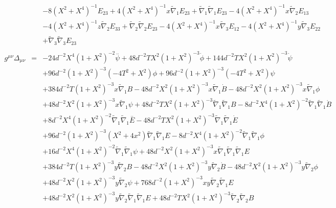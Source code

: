 \documentclass[10pt,letterpaper]{article}
\numberwithin{equation}{section}
\begin{document}
\begin{appendices}
\begin{eqnarray}
&& - 8 (X^2 + X^4)^{-1} E_{23} + 4 (X^2 + X^4)^{-1} x \tilde{\nabla}_{1}E_{23} + \tilde{\nabla}_{1}\tilde{\nabla}_{1}E_{23} - 4 (X^2 + X^4)^{-1} x \tilde{\nabla}_{2}E_{13} \nonumber \\ 
&& - 4 (X^2 + X^4)^{-1} z \tilde{\nabla}_{2}E_{33} + \tilde{\nabla}_{2}\tilde{\nabla}_{2}E_{23} - 4 (X^2 + X^4)^{-1} x \tilde{\nabla}_{3}E_{12} - 4 (X^2 + X^4)^{-1} y \tilde{\nabla}_{3}E_{22} \nonumber \\ 
&& + \tilde{\nabla}_{3}\tilde{\nabla}_{3}E_{23}
\\  \nonumber\\ 
g^{\mu\nu}\Delta_{\mu\nu}&=& -24 d^{-2} X^4 (1 + X^2)^{-2} \overset{..}{\psi} + 48 d^{-2} T X^2 (1 + X^2)^{-3} \dot{\phi} + 144 d^{-2} T X^2 (1 + X^2)^{-3} \dot{\psi} \nonumber \\ 
&& + 96 d^{-2} (1 + X^2)^{-3} (-4 T^2 + X^2) \phi + 96 d^{-2} (1 + X^2)^{-3} (-4 T^2 + X^2) \psi \nonumber \\ 
&& + 384 d^{-2} T (1 + X^2)^{-3} x \tilde{\nabla}_{1}B - 48 d^{-2} X^2 (1 + X^2)^{-3} x \tilde{\nabla}_{1}\dot{B} - 48 d^{-2} X^2 (1 + X^2)^{-3} x \tilde{\nabla}_{1}\phi \nonumber \\ 
&& + 48 d^{-2} X^2 (1 + X^2)^{-3} x \tilde{\nabla}_{1}\psi + 48 d^{-2} T X^2 (1 + X^2)^{-3} \tilde{\nabla}_{1}\tilde{\nabla}_{1}B - 8 d^{-2} X^4 (1 + X^2)^{-2} \tilde{\nabla}_{1}\tilde{\nabla}_{1}\dot{B} \nonumber \\ 
&& + 8 d^{-2} X^4 (1 + X^2)^{-2} \tilde{\nabla}_{1}\tilde{\nabla}_{1}\overset{..}{E} - 48 d^{-2} T X^2 (1 + X^2)^{-3} \tilde{\nabla}_{1}\tilde{\nabla}_{1}\dot{E} \nonumber \\ 
&& + 96 d^{-2} (1 + X^2)^{-3} (X^2 + 4 x^2) \tilde{\nabla}_{1}\tilde{\nabla}_{1}E - 8 d^{-2} X^4 (1 + X^2)^{-2} \tilde{\nabla}_{1}\tilde{\nabla}_{1}\phi \nonumber \\ 
&& + 16 d^{-2} X^4 (1 + X^2)^{-2} \tilde{\nabla}_{1}\tilde{\nabla}_{1}\psi + 48 d^{-2} X^2 (1 + X^2)^{-3} x \tilde{\nabla}_{1}\tilde{\nabla}_{1}\tilde{\nabla}_{1}E \nonumber \\ 
&& + 384 d^{-2} T (1 + X^2)^{-3} y \tilde{\nabla}_{2}B - 48 d^{-2} X^2 (1 + X^2)^{-3} y \tilde{\nabla}_{2}\dot{B} - 48 d^{-2} X^2 (1 + X^2)^{-3} y \tilde{\nabla}_{2}\phi \nonumber \\ 
&& + 48 d^{-2} X^2 (1 + X^2)^{-3} y \tilde{\nabla}_{2}\psi + 768 d^{-2} (1 + X^2)^{-3} x y \tilde{\nabla}_{2}\tilde{\nabla}_{1}E \nonumber \\ 
&& + 48 d^{-2} X^2 (1 + X^2)^{-3} y \tilde{\nabla}_{2}\tilde{\nabla}_{1}\tilde{\nabla}_{1}E + 48 d^{-2} T X^2 (1 + X^2)^{-3} \tilde{\nabla}_{2}\tilde{\nabla}_{2}B \nonumber \\ 

\end{eqnarray}
\end{appendices}
\end{document}
